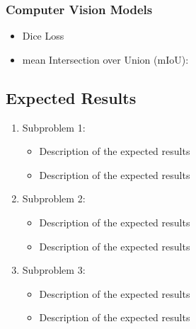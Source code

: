 \begin{multicols}{2}
    \subsubsection{Computer Vision Models}
        \begin{itemize}
            \item Dice Loss
            \item mean Intersection over Union (mIoU): 
        \end{itemize}

    
    

\subsection{Expected Results}

\begin{enumerate}
    \item Subproblem 1: 
        \begin{itemize}
            \item Description of the expected results
            \item Description of the expected results
        \end{itemize}
    \item Subproblem 2:
        \begin{itemize}
            \item Description of the expected results
            \item Description of the expected results
        \end{itemize}
    \item Subproblem 3:
        \begin{itemize}
            \item Description of the expected results
            \item Description of the expected results
        \end{itemize}
\end{enumerate}

\end{multicols}
\bigskip